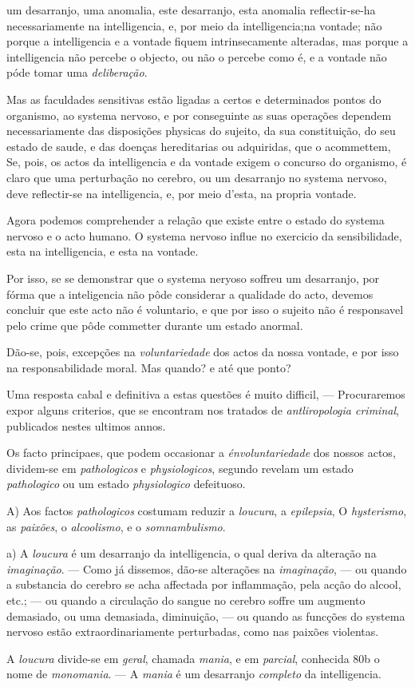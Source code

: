 um desarranjo, uma anomalia, este desarranjo, esta anomalia reflectir-se-ha necessariamente na intelligencia, e, por meio da intelligencia;na vontade; não porque a intelligencia e a vontade fiquem intrinsecamente alteradas, mas porque a intelligencia não percebe o objecto, ou não o percebe como é, e a vontade não póde tomar uma \emph{deliberação}.\par Mas as faculdades sensitivas estão ligadas a certos e determinados pontos do organismo, ao systema nervoso, e por conseguinte as suas operações dependem necessariamente das disposições physicas do sujeito, da sua constituição, do seu estado de saude, e das doenças hereditarias ou adquiridas, que o acommettem, Se, pois, os actos da intelligencia e da vontade exigem o concurso do organismo, é claro que uma perturbação no cerebro, ou um desarranjo no systema nervoso, deve reflectir-se na intelligencia, e, por meio d'esta, na propria vontade.\par Agora podemos comprehender a relação que existe entre o estado do systema nervoso e o acto humano. O systema nervoso influe no exercicio da sensibilidade, esta na intelligencia, e esta na vontade.\par Por isso, se se demonstrar que o systema neryoso soffreu um desarranjo, por fórma que a inteligencia não pôde considerar a qualidade do acto, devemos concluir que este acto não é voluntario, e que por isso o sujeito não é responsavel pelo crime que pôde commetter durante um estado anormal.\par Dão-se, pois, excepções na \emph{voluntariedade} dos actos da nossa vontade, e por isso na responsabilidade moral. Mas quando? e até que ponto?\par Uma resposta cabal e definitiva a estas questões é muito difficil, --- Procuraremos expor alguns criterios, que se encontram nos tratados de \emph{antliropologia criminal}, publicados nestes ultimos annos.\par *\par Os facto principaes, que podem occasionar a \emph{énvoluntariedade} dos nossos actos, dividem-se em \emph{pathologicos} e \emph{physiologicos}, segundo revelam um estado \emph{pathologico} ou um estado \emph{physiologico} defeituoso.\par A) Aos factos \emph{pathologicos} costumam reduzir a \emph{loucura}, a \emph{epilepsia}, O \emph{hysterismo}, as \emph{paixões}, o \emph{alcoolismo}, e o \emph{somnambulismo}.\par a) A \emph{loucura} é um desarranjo da intelligencia, o qual deriva da alteração na \emph{imaginação}. --- Como já dissemos, dão-se alterações na \emph{imaginação}, --- ou quando a substancia do cerebro se acha affectada por inflammação, pela acção do alcool, etc.; --- ou quando a circulação do sangue no cerebro soffre um augmento demasiado, ou uma demasiada, diminuição, --- ou quando as funcções do systema nervoso estão extraordinariamente perturbadas, como nas paixões violentas.\par A \emph{loucura} divide-se em \emph{geral}, chamada \emph{mania}, e em \emph{parcial}, conhecida 80b o nome de \emph{monomania}. --- A \emph{mania} é um desarranjo \emph{completo} da intelligencia. 